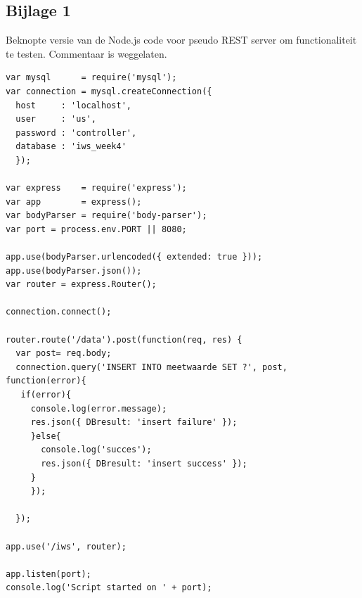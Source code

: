 \documentclass[12pt]{article}
\begin{document}
\subsection*{Bijlage 1}
Beknopte versie van de Node.js code voor pseudo REST server om functionaliteit te testen. Commentaar is weggelaten.
\begin{lstlisting}
var mysql      = require('mysql');
var connection = mysql.createConnection({
  host     : 'localhost',
  user     : 'us',
  password : 'controller',
  database : 'iws_week4'
  });

var express    = require('express');
var app        = express();  
var bodyParser = require('body-parser');
var port = process.env.PORT || 8080;

app.use(bodyParser.urlencoded({ extended: true }));
app.use(bodyParser.json()); 
var router = express.Router(); 

connection.connect();

router.route('/data').post(function(req, res) {
  var post= req.body;
  connection.query('INSERT INTO meetwaarde SET ?', post, function(error){
   if(error){
     console.log(error.message);
     res.json({ DBresult: 'insert failure' });
     }else{
       console.log('succes');
       res.json({ DBresult: 'insert success' });
     }
     });
  
  });

app.use('/iws', router);

app.listen(port);
console.log('Script started on ' + port);
\end{lstlisting}
\end{document}
